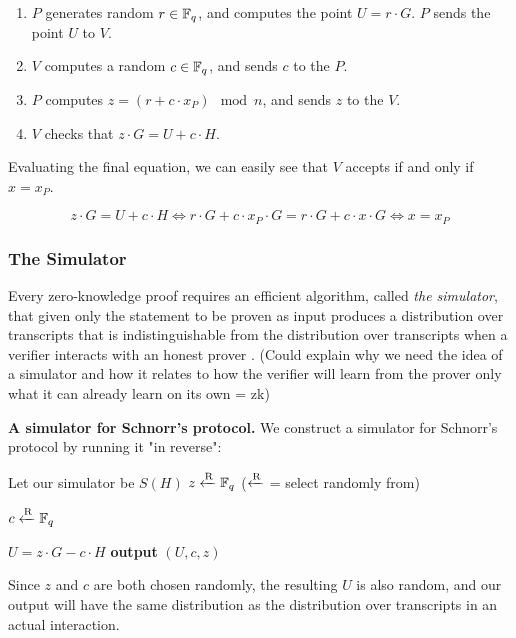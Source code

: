 \begin{enumerate}
    \item $P$ generates random $r \in \mathbb{F}_q$, and computes the point $U = r \cdot G$. $P$ sends the point $U$ to $V$.
    \item $V$ computes a random $c \in \mathbb{F}_q$, and sends $c$ to the $P$.
    \item $P$ computes $z = (r + c \cdot x_P) \mod n$, and sends $z$ to the $V$.
    \item $V$ checks that $z \cdot G = U + c \cdot H$.
\end{enumerate} 

Evaluating the final equation, we can easily see that $V$ accepts if and only if $x = x_P$. 

\begin{equation*}
    z \cdot G = U + c \cdot H \iff
    r \cdot G + c \cdot x_P \cdot G  = r \cdot G + c \cdot x \cdot G \iff
    x  =  x_P
\end{equation*}

\subsubsection{The Simulator}
Every zero-knowledge proof requires an efficient algorithm, called \textit{the simulator}, that given only the statement to be proven as input produces a distribution over transcripts that is indistinguishable from the distribution over transcripts when a verifier interacts with an honest prover \cite{PAZK}. (Could explain why we need the idea of a simulator and how it relates to how the verifier will learn from the prover only what it can already learn on its own = zk)

\textbf{A simulator for Schnorr's protocol.} We construct a simulator for Schnorr's protocol by running it "in reverse":

\begin{center}
    \begin{problem}[]{Let our simulator be $S(H)$}
    $z \xleftarrow{\text{\scriptsize R}} \mathbb{F}_q$ ($\xleftarrow{\text{\scriptsize R}}$ = select randomly from)
    
    $c \xleftarrow{\text{\scriptsize R}} \mathbb{F}_q$
    
    $U = z \cdot G - c \cdot H$
    \tcblower
    \textbf{output} $(U,c,z)$
    \end{problem}
\end{center}

Since $z$ and $c$ are both chosen randomly, the resulting $U$ is also random, and our output will have the same distribution as the distribution over transcripts in an actual interaction.

